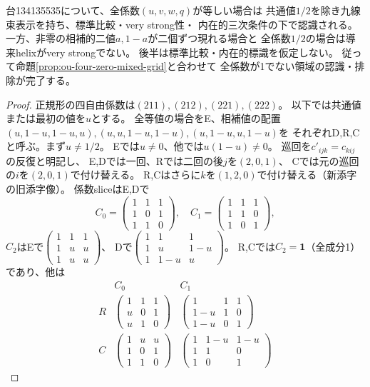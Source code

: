 \begin{theorem}
\label{thm:ou-four-zero-mixed-triangle}
台134135535について、全係数$(u,v,w,q)$が等しい場合は
共通値$1/2$を除き九線束表示を持ち、標準比較・very strong性・
内在的三次条件の下で認識される。
一方、非零の相補的二値$a,1-a$が二個ずつ現れる場合と
全係数$1/2$の場合は導来helixがvery strongでない。
後半は標準比較・内在的標識を仮定しない。
従って命題\ref{prop:ou-four-zero-mixed-grid}と合わせて
全係数が1でない領域の認識・排除が完了する。
\end{theorem}
\begin{proof}
正規形の四自由係数は$(211),(212),(221),(222)$。
以下では共通値または最初の値を$u$とする。
全等値の場合をE、相補値の配置
$(u,1-u,1-u,u),(u,u,1-u,1-u),(u,1-u,u,1-u)$を
それぞれD,R,Cと呼ぶ。まず$u\ne1/2$。
Eでは$u\ne0$、他では$u(1-u)\ne0$。
巡回を$c'_{ijk}=c_{kij}$の反復と明記し、
E,Dでは一回、Rでは二回の後$j$を$(2,0,1)$、
Cでは元の巡回の$i$を$(2,0,1)$で付け替える。
R,Cはさらに$k$を$(1,2,0)$で付け替える（新添字の旧添字像）。
係数sliceはE,Dで
\[
 C_0=\begin{pmatrix}1&1&1\\1&0&1\\1&1&0\end{pmatrix},\quad
 C_1=\begin{pmatrix}1&1&1\\1&1&0\\1&0&1\end{pmatrix},
\]
$C_2$はEで$\begin{pmatrix}1&1&1\\1&u&u\\1&u&u\end{pmatrix}$、
Dで$\begin{pmatrix}1&1&1\\1&u&1-u\\1&1-u&u\end{pmatrix}$。
R,Cでは$C_2=\mathbf1$（全成分1）であり、他は
\[
\begin{array}{c|cc}
 &C_0&C_1\\\hline
 R&\begin{pmatrix}1&1&1\\u&0&1\\u&1&0\end{pmatrix}&
 \begin{pmatrix}1&1&1\\1-u&1&0\\1-u&0&1\end{pmatrix}\\
 C&\begin{pmatrix}1&u&u\\1&0&1\\1&1&0\end{pmatrix}&
 \begin{pmatrix}1&1-u&1-u\\1&1&0\\1&0&1\end{pmatrix}
\end{array}
\]


\end{proof}
